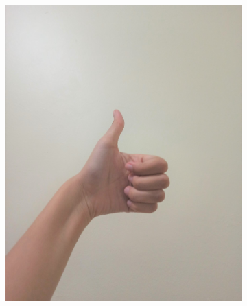 \documentclass[conference]{IEEEtran}
\begin{document}
\begin{figure} [h]
\begin{center}
\begin{subfigure}[t]{0.11\textwidth}
				\includegraphics[width=\textwidth]{img/pola8c.jpg}
				\caption{\label{fig:gs8c}}
			\end{subfigure}
			\hspace{0.1em}
			\begin{subfigure}[t]{0.11\textwidth}
				\centering

\end{subfigure}
\end{center}
\end{figure}
\end{document}
